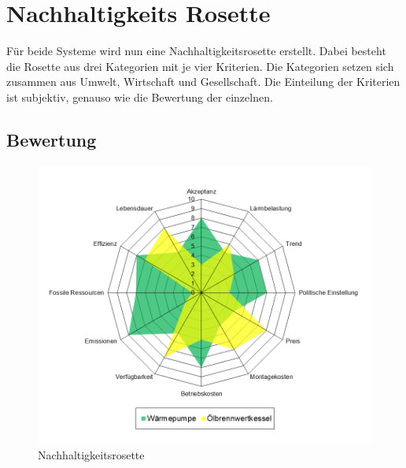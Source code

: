\chapter{Nachhaltigkeits Rosette}
\label{chap:rosette}

Für beide Systeme wird nun eine Nachhaltigkeitsrosette erstellt. Dabei besteht die Rosette aus drei Kategorien mit je vier Kriterien. Die Kategorien setzen sich zusammen aus Umwelt, Wirtschaft und Gesellschaft. Die Einteilung der Kriterien ist subjektiv, genauso wie die Bewertung der einzelnen.



\section{Bewertung}

\begin{figure}[h]
\includegraphics[scale=0.55]{bilder/Rosette.png}
\caption{Nachhaltigkeitsrosette}
\end{figure}

